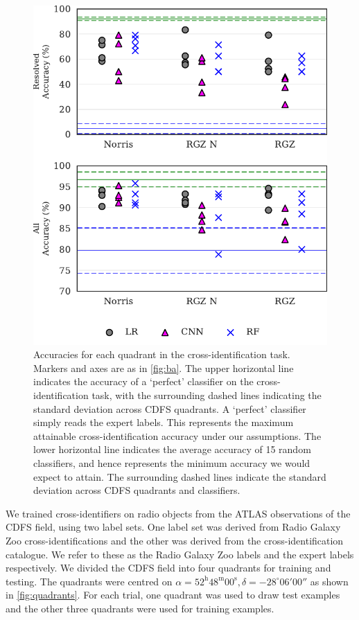 \documentclass[fleqn,usenatbib,usedcolumn]{mnras}
\begin{document}
  \begin{figure}
    \centering
    \includegraphics[width=\columnwidth]{images/cdfs_cross_identification_grid.pdf}
    \caption{Accuracies for each quadrant in the cross-identification
      task. Markers and axes are as in \autoref{fig:ba}. The upper horizontal line
      indicates the accuracy of a `perfect' classifier on the cross-identification
      task, with the surrounding dashed lines indicating the standard deviation
      across CDFS quadrants. A `perfect' classifier simply reads the expert
      labels. This represents the maximum attainable cross-identification accuracy
      under our assumptions. The lower horizontal line indicates the average
      accuracy of 15 random classifiers, and hence represents the minimum accuracy
      we would expect to attain. The surrounding dashed lines indicate the
      standard deviation across CDFS quadrants and classifiers.
      \label{fig:cross-id-accuracy}}
  \end{figure}

    We trained cross-identifiers on radio objects from the ATLAS observations of
    the CDFS field, using two label sets. One label set was derived from Radio
    Galaxy Zoo cross-identifications and the other was derived from the
    \citet{norris06} cross-identification catalogue. We refer to these as the
    Radio Galaxy Zoo labels and the expert labels respectively. We divided the
    CDFS field into four quadrants for training and testing. The quadrants were
    centred on $\alpha = 52^\text{h}48^\text{m}00^\text{s},
    \delta = -28^\circ{}06'00''$ as shown in \autoref{fig:quadrants}. For
    each trial, one quadrant was used to draw test examples and the other three
    quadrants were used for training examples.
\end{document}
